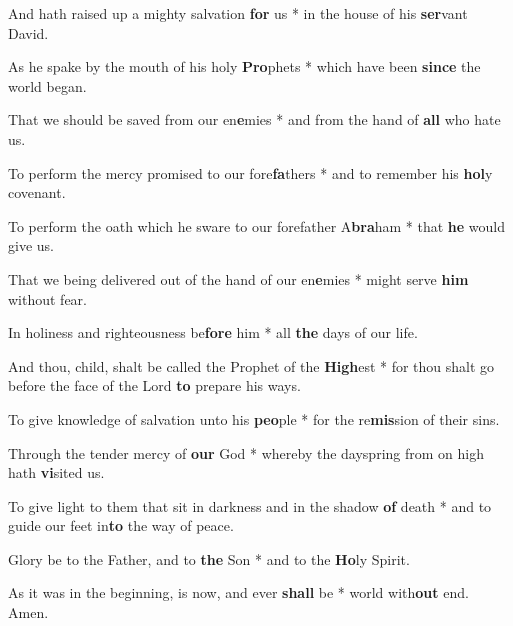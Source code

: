 \begin{multicols}{2}
	And hath raised up a mighty salvation \textbf{for} us * in the house of his \textbf{ser}vant David.
	
	As he spake by the mouth of his holy \textbf{Pro}phets * which have been \textbf{since} the world began.
	
	That we should be saved from our en\textbf{e}mies * and from the hand of \textbf{all} who hate us.
	
	To perform the mercy promised to our fore\textbf{fa}thers * and to remember his \textbf{hol}y covenant.
	
	To perform the oath which he sware to our forefather A\textbf{bra}ham * that \textbf{he} would give us.
	
	That we being delivered out of the hand of our en\textbf{e}mies * might serve \textbf{him} without fear.
	
	In holiness and righteousness be\textbf{fore} him * all \textbf{the} days of our life.
	
	And thou, child, shalt be called the Prophet of the \textbf{High}est * for thou shalt go before the face of the Lord \textbf{to} prepare his ways.
	
	To give knowledge of salvation unto his \textbf{peo}ple * for the re\textbf{mis}sion of their sins.
	
	Through the tender mercy of \textbf{our} God * whereby the dayspring from on high hath \textbf{vi}sited us.
	
	To give light to them that sit in darkness and in the shadow \textbf{of} death * and to guide our feet in\textbf{to} the way of peace.
	
	Glory be to the Father, and to \textbf{the} Son * and to the \textbf{Ho}ly Spirit.
	
	As it was in the beginning, is now, and ever \textbf{shall} be * world with\textbf{out} end. Amen.
\end{multicols}
